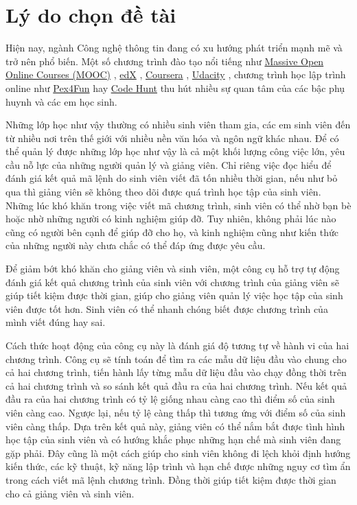 \section{Lý do chọn đề tài}
Hiện nay, ngành Công nghệ thông tin đang có xu hướng phát triển mạnh mẽ và trở nên phổ biến. Một số chương trình đào tạo nổi tiếng như
\href{https://www.coursera.org/course/saas}{Massive Open Online
  Courses (MOOC)} \cite{mooc}, \href{https://www.edx.org/}{edX}
\cite{edx}, \href{https://www.coursera.org/}{Coursera}
\cite{coursera}, \href{http://www.udacity.com/}{Udacity}
\cite{Udacity}, chương trình
học lập trình online như \href{https://www.pexforfun.com/}{Pex4Fun}
\cite{Pex4Fun} hay
\href{https://www.microsoft.com/en-us/research/project/code-hunt/}{Code
  Hunt} \cite{CodeHunt} thu hút nhiều sự quan tâm của các bậc phụ huynh và các em học sinh.

Những lớp học như vậy thường có nhiều sinh viên tham gia, các em sinh viên đến từ nhiều nơi trên thế giới với nhiều nền văn hóa và ngôn ngữ khác nhau. Để có thể quản lý được những lớp học như vậy là cả một khối lượng công việc lớn, yêu cầu nỗ lực của những người quản lý và giảng viên. Chỉ riêng việc đọc hiểu để đánh giá kết quả mã lệnh do sinh viên viết đã tốn nhiều thời gian, nếu như bỏ qua thì giảng viên sẽ không theo dõi được quá trình học tập của sinh viên. Những lúc khó khăn trong việc viết mã chương trình, sinh viên
có thể nhờ bạn bè hoặc nhờ những người có kinh nghiệm giúp đỡ. Tuy nhiên, không phải lúc nào cũng có người bên cạnh để giúp đỡ cho họ, và kinh nghiệm cũng như kiến thức của những người này chưa chắc có thể đáp ứng được yêu cầu.

Để giảm bớt khó khăn cho giảng viên và sinh viên, một công cụ hỗ trợ tự động đánh giá kết quả chương trình của sinh viên với chương trình của giảng viên sẽ giúp tiết kiệm được thời gian, giúp cho giảng viên quản lý việc học tập của sinh viên được tốt hơn. Sinh viên có thể nhanh chóng biết được chương trình của mình viết đúng hay sai.

Cách thức hoạt động của công cụ này là đánh giá độ tương tự về hành vi của hai chương trình. Công cụ sẽ tính toán để tìm ra các mẫu dữ liệu đầu vào chung cho cả hai chương trình, tiến hành lấy từng mẫu dữ liệu đầu vào chạy đồng thời trên cả hai chương trình và so sánh kết quả đầu ra của hai chương trình. Nếu kết quả đầu ra của hai chương trình có tỷ lệ giống nhau càng cao thì điểm số của sinh viên càng cao. Ngược lại, nếu tỷ lệ càng thấp thì tương ứng với điểm số của sinh viên càng thấp. Dựa trên kết quả này, giảng viên có thể nắm bắt được tình hình học tập của sinh viên và có hướng khắc phục những hạn chế mà sinh viên đang gặp phải. Đây cũng là một cách giúp cho sinh viên không đi lệch khỏi định hướng kiến thức, các kỹ thuật, kỹ năng lập trình và hạn chế được những nguy cơ tìm ẩn trong cách viết mã lệnh chương trình. Đồng thời giúp tiết kiệm được thời gian cho cả giảng viên và sinh viên.

